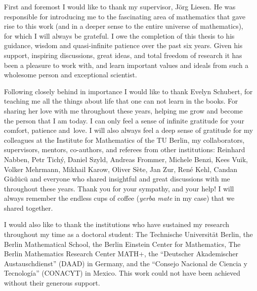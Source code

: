 \begin{changemargin}{-0.3cm}{-0.3cm}
\vspace*{-0.9em}\noindent
First and foremost I would like to thank my supervisor, J{\"o}rg Liesen.
He was responsible for introducing me to the fascinating area of mathematics that gave rise to this work (and in a deeper sense to the entire universe of mathematics), for which I will always be grateful. I owe the completion of this thesis to his guidance, wisdom and quasi-infinite patience over the past six years. Given his support, inspiring discussions, great ideas, and total freedom of research it has been a pleasure to work with, and learn important values and ideals from such a wholesome person and exceptional scientist.

Following closely behind in importance I would like to thank Evelyn Schubert,
for teaching me all the things about life that one can not learn in the books. For sharing her love with me throughout these years, helping me grow and become the person that I am today. I can only feel a sense of infinite gratitude for your comfort, patience and~love.\linebreak
\indent I will also always feel a deep sense of gratitude for my colleagues at the Institute for Mathematics of the TU Berlin, my collaborators, supervisors, mentors, co-authors, and referees from other institutions: Reinhard Nabben, Petr Tich{\'y}, Daniel Szyld, Andreas Frommer, Michele Benzi, Kees Vuik, Volker Mehrmann, Mikhail Karow, Oliver S{\`e}te, Jan Zur, Ren{\'e} Kehl, Candan G{\"u}d{\"u}c{\"u} and everyone who shared insightful and great discussions with me throughout these years. Thank you for your sympathy, and your help! I will always remember the endless cups of coffee (\emph{yerba mate} in my case) that we shared together.

I would also like to thank the institutions who have sustained my research throughout my time as a doctoral student: The Technische Universit\"at Berlin, the Berlin Mathematical School, the Berlin Einstein Center for Mathematics, The Berlin Mathematics Research Center MATH+, the ``Deutscher Akademischer Austauschdienst'' (DAAD) in Germany, and the ``Consejo Nacional de Ciencia y Tecnolog\'ia'' (CONACYT) in Mexico. This work could not have been achieved without their generous support.



\end{changemargin}
